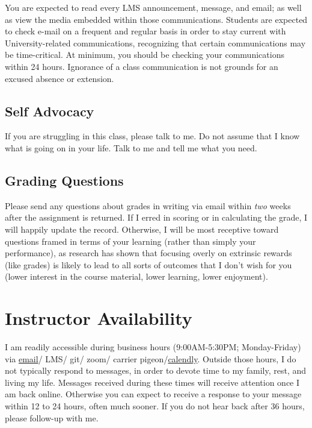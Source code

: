 \documentclass[
]{book}
\begin{document}
You are expected to read every LMS announcement, message, and email; as well as view the media embedded within those communications. Students are expected to check e-mail on a frequent and regular basis in order to stay current with University-related communications, recognizing that certain communications may be time-critical. At minimum, you should be checking your communications within 24 hours. Ignorance of a class communication is not grounds for an excused absence or extension.

\hypertarget{self-advocacy}{%
\subsection{Self Advocacy}\label{self-advocacy}}

If you are struggling in this class, please talk to me. Do not assume that I know what is going on in your life. Talk to me and tell me what you need.

\hypertarget{grading-questions}{%
\subsection{Grading Questions}\label{grading-questions}}

Please send any questions about grades in writing via email within \emph{two} weeks after the assignment is returned. If I erred in scoring or in calculating the grade, I will happily update the record. Otherwise, I will be most receptive toward questions framed in terms of your learning (rather than simply your performance), as research has shown that focusing overly on extrinsic rewards (like grades) is likely to lead to all sorts of outcomes that I don't wish for you (lower interest in the course material, lower learning, lower enjoyment).

\hypertarget{instructor-availability}{%
\section{Instructor Availability}\label{instructor-availability}}

I am readily accessible during business hours (9:00AM-5:30PM; Monday-Friday) via \href{garrissm@wfu.edu}{email}/ LMS/ git/ zoom/ carrier pigeon/\href{https://calendly.com/smasongarrison/}{calendly}. Outside those hours, I do not typically respond to messages, in order to devote time to my family, rest, and living my life. Messages received during these times will receive attention once I am back online. Otherwise you can expect to receive a response to your message within 12 to 24 hours, often much sooner. If you do not hear back after 36 hours, please follow-up with me.
\end{document}
